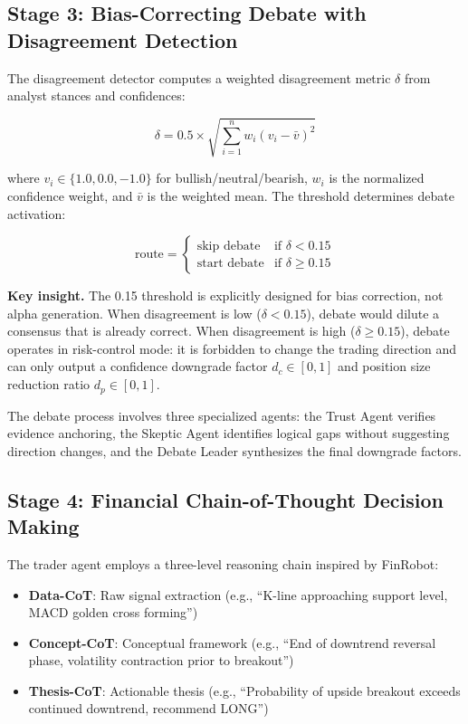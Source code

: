 \documentclass[twocolumn]{article}
\begin{document}
\subsection{Stage 3: Bias-Correcting Debate with Disagreement Detection}

The disagreement detector computes a weighted disagreement metric $\delta$ from analyst stances and confidences:

\begin{equation}
\delta = 0.5 \times \sqrt{\sum_{i=1}^{n} w_i (v_i - \bar{v})^2}
\end{equation}

where $v_i \in \{1.0, 0.0, -1.0\}$ for bullish/neutral/bearish, $w_i$ is the normalized confidence weight, and $\bar{v}$ is the weighted mean. The threshold determines debate activation:

\begin{equation}
\text{route} =
\begin{cases}
\text{skip debate} & \text{if } \delta < 0.15 \\
\text{start debate} & \text{if } \delta \geq 0.15
\end{cases}
\end{equation}

\textbf{Key insight.} The 0.15 threshold is explicitly designed for bias correction, not alpha generation. When disagreement is low ($\delta < 0.15$), debate would dilute a consensus that is already correct. When disagreement is high ($\delta \geq 0.15$), debate operates in risk-control mode: it is forbidden to change the trading direction and can only output a confidence downgrade factor $d_c \in [0, 1]$ and position size reduction ratio $d_p \in [0, 1]$.

The debate process involves three specialized agents: the Trust Agent verifies evidence anchoring, the Skeptic Agent identifies logical gaps without suggesting direction changes, and the Debate Leader synthesizes the final downgrade factors.

\subsection{Stage 4: Financial Chain-of-Thought Decision Making}

The trader agent employs a three-level reasoning chain inspired by FinRobot\cite{finrobot2024cot}:

\begin{itemize}
    \item \textbf{Data-CoT}: Raw signal extraction (e.g., ``K-line approaching support level, MACD golden cross forming'')
    \item \textbf{Concept-CoT}: Conceptual framework (e.g., ``End of downtrend reversal phase, volatility contraction prior to breakout'')
    \item \textbf{Thesis-CoT}: Actionable thesis (e.g., ``Probability of upside breakout exceeds continued downtrend, recommend LONG'')
\end{itemize}
\end{document}
